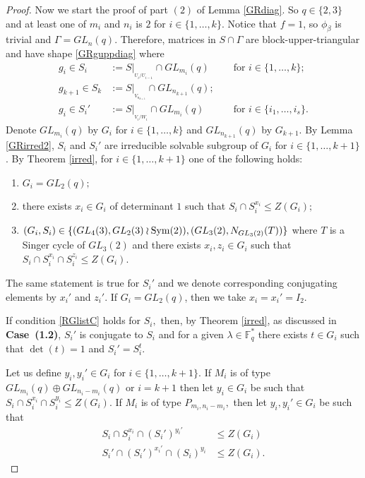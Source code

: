 \begin{proof}
\bigskip

Now we start the proof of part $(2)$ of Lemma \ref{GRdiag}. So $q \in \{2,3\}$ and at least one of $m_i$ and $n_i$ is $2$ for $i \in \{1, \ldots, k\}$. Notice that $f=1$, so $\phi_{\beta}$ is trivial and $\Gamma =GL_n(q)$. Therefore, matrices in $S \cap \Gamma$ are block-upper-triangular and have shape \eqref{GRguppdiag} where 
\begin{align*}
g_i \in S_i & :=S|_{_{U_i/U_{i-1}}} \cap GL_{m_i} (q)  &&\text{ for } i\in \{1, \ldots, k\};\\
g_{k+1} \in S_k & := S|_{_{V_{n_{k+1}}}} \cap GL_{n_{k+1}} (q); &&\\
g_i \in S_i' & :=S|_{_{V_i/W_{i}}} \cap GL_{m_i} (q) && \text{ for } i\in \{i_1, \ldots, i_s\}.
 \end{align*}
Denote $GL_{m_i}(q)$ by $G_i$ for $i \in \{1, \ldots, k\}$ and $GL_{n_{k+1}}(q)$ by $G_{k+1}.$ By Lemma \ref{GRirred2}, $S_i$ and $S_i'$ are irreducible solvable subgroup of $G_i$ for $i \in \{1, \ldots, k+1\}$. By Theorem \ref{irred}, for $i \in \{1, \ldots, k+1\}$ one of the following holds:
\begin{enumerate}[label=(\roman*)]
\item $G_i=GL_2(q);$ \label{RGlistA} 
\item there exists $x_i \in G_i$ of determinant $1$ such that $S_i \cap S_i^{x_i} \le Z(G_i);$ \label{RGlistB}
\item $(G_i, S_i) \in \{(GL_4(3),GL_2(3) \wr \mathrm{Sym}(2)), (GL_3(2), N_{GL_3(2)}(T))\}$ where $T$ is a Singer cycle of $GL_3(2)$ and there exists $x_i, z_i \in G_i$ such that $S_i \cap S_i^{x_i} \cap S_i^{z_i} \le Z(G_i)$.\label{RGlistC}
\end{enumerate}
The same statement is true for $S_i'$ and we denote corresponding conjugating elements by $x_i'$ and $z_i'$. If $G_i=GL_2(q)$, then we take $x_i=x_i'=I_2.$

 If condition \ref{RGlistC}  holds for $S_i,$ then, by Theorem \ref{irred}, as discussed in {\bf Case~(1.2)}, $S_i'$ is conjugate to $S_i$  and for a given $\lambda \in \mathbb{F}_q^*$ there exists  $t \in G_i$ such that $\det(t)=1$ and $S_i'=S_i^t.$ 

Let us define $y_i, y_i' \in G_i$ for $i \in \{1, \ldots, k+1\}.$ %
 If $M_i$ is of type $GL_{m_i}(q) \oplus GL_{n_i-m_i}(q)$ or $i=k+1$ then let $y_i \in G_i$ be such that $S_i \cap S_i^{x_i} \cap S_i^{y_i} \le Z(G_i).$ If $M_i$ is of type $P_{m_i, n_i-m_i},$ then let $y_i, y_i' \in G_i$ be such that 
\begin{align*}
S_i \cap S_i^{x_i} \cap (S_i')^{y_i'} & \le Z(G_i)\\
S_i' \cap (S_i')^{x_i'} \cap (S_i)^{y_i} & \le Z(G_i).
\end{align*} 


\end{proof}
